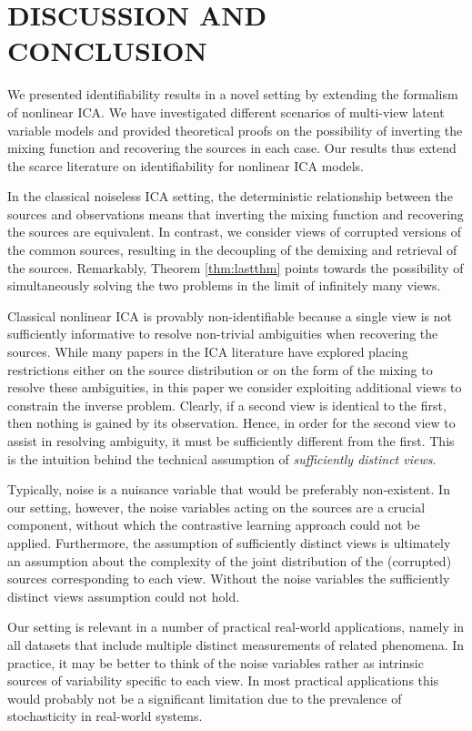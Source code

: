 \documentclass[letterpaper]{article}
\theoremstyle{definition}
\begin{document}
\section{DISCUSSION AND CONCLUSION}
\label{sec:on_suffistv}
We presented identifiability results in a novel setting by extending the formalism of nonlinear ICA.
We have investigated different scenarios of multi-view latent variable models and provided theoretical proofs on the possibility of inverting the mixing function and recovering the sources in each case.
Our results thus extend the scarce literature on identifiability for nonlinear ICA models.

In the classical noiseless ICA setting, the deterministic relationship between the sources and observations means that inverting the mixing function and recovering the sources are equivalent.
In contrast, we consider views of corrupted versions of the common sources, resulting in the decoupling of the demixing and retrieval of the sources.
Remarkably, Theorem \ref{thm:lastthm} points towards the possibility of simultaneously solving the two problems in the limit of infinitely many views.

Classical nonlinear ICA is provably non-identifiable because a single view is not sufficiently informative to resolve non-trivial ambiguities when recovering the sources.
While many papers in the ICA literature have explored placing restrictions either on the source distribution or on the form of the mixing to resolve these ambiguities, in this paper we consider exploiting additional views to constrain the inverse problem.
Clearly, if a second view is identical to the first, then nothing is gained by its observation.
Hence, in order for the second view to assist in resolving ambiguity, it must be sufficiently different from the first.
This is the intuition behind the technical assumption of \emph{sufficiently distinct views}.


Typically, noise is a nuisance variable that would be preferably non-existent.
In our setting, however, the noise variables acting on the sources are a crucial component, without which the contrastive learning approach could not be applied.
Furthermore, the assumption of sufficiently distinct views is ultimately an assumption about the complexity of the joint distribution of the (corrupted) sources corresponding to each view.
Without the noise variables the sufficiently distinct views assumption could not hold.


Our setting is relevant in a number of practical real-world applications, namely in all datasets that include multiple distinct measurements of related phenomena.
In practice, it may be better to think of the noise variables rather as intrinsic sources of variability specific to each view.
In most practical applications this would probably not be a significant limitation due to the prevalence of stochasticity in real-world systems.
\end{document}
